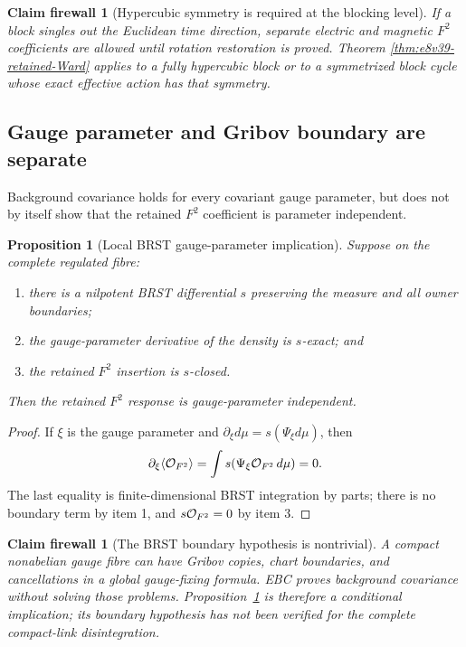 \documentclass[11pt,oneside]{book}
\newtheorem{proposition}[theorem]{Proposition}
\newtheorem{firewall}[theorem]{Claim firewall}
\theoremstyle{definition}
\theoremstyle{remark}
\begin{document}
\begin{firewall}[Hypercubic symmetry is required at the blocking
level]
\label{fire:e8v39-block-symmetry}
If a block singles out the Euclidean time direction, separate
electric and magnetic \(F^2\) coefficients are allowed until
rotation restoration is proved.  Theorem
\ref{thm:e8v39-retained-Ward} applies to a fully hypercubic block or
to a symmetrized block cycle whose exact effective action has that
symmetry.
\end{firewall}

\subsection{Gauge parameter and Gribov boundary are separate}

Background covariance holds for every covariant gauge parameter, but
does not by itself show that the retained \(F^2\) coefficient is
parameter independent.

\begin{proposition}[Local BRST gauge-parameter implication]
\label{prop:e8v39-gauge-parameter}
Suppose on the complete regulated fibre:
\begin{enumerate}
\item there is a nilpotent BRST differential \(s\) preserving the
      measure and all owner boundaries;
\item the gauge-parameter derivative of the density is
      \(s\)-exact; and
\item the retained \(F^2\) insertion is \(s\)-closed.
\end{enumerate}
Then the retained \(F^2\) response is gauge-parameter independent.
\end{proposition}

\begin{proof}
If \(\xi\) is the gauge parameter and
\(\partial_\xi d\mu=s(\Psi_\xi d\mu)\), then
\[
 \partial_\xi\langle{\cal O}_{F^2}\rangle
 =
 \int s(\Psi_\xi{\cal O}_{F^2}\,d\mu)=0.
\]
The last equality is finite-dimensional BRST integration by parts;
there is no boundary term by item 1, and
\(s{\cal O}_{F^2}=0\) by item 3.
\end{proof}

\begin{firewall}[The BRST boundary hypothesis is nontrivial]
\label{fire:e8v39-Gribov}
A compact nonabelian gauge fibre can have Gribov copies, chart
boundaries, and cancellations in a global gauge-fixing formula.
EBC proves background covariance without solving those problems.
Proposition~\ref{prop:e8v39-gauge-parameter} is therefore a
conditional implication; its boundary hypothesis has not been
verified for the complete compact-link disintegration.
\end{firewall}
\end{document}
